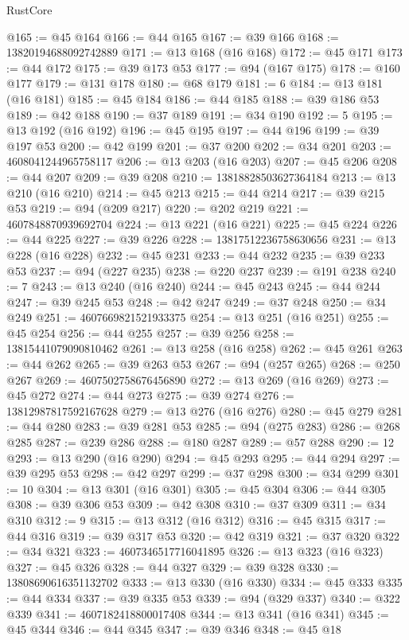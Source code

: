 \begin{lexlean}{RustCore}
\begin{coremodule}
@165 := @45 @164
@166 := @44 @165
@167 := @39 @166
@168 := 13820194688092742889
@171 := @13 @168 (@16 @168)
@172 := @45 @171
@173 := @44 @172
@175 := @39 @173 @53
@177 := @94 (@167 @175)
@178 := @160 @177
@179 := @131 @178
@180 := @68 @179
@181 := 6
@184 := @13 @181 (@16 @181)
@185 := @45 @184
@186 := @44 @185
@188 := @39 @186 @53
@189 := @42 @188
@190 := @37 @189
@191 := @34 @190
@192 := 5
@195 := @13 @192 (@16 @192)
@196 := @45 @195
@197 := @44 @196
@199 := @39 @197 @53
@200 := @42 @199
@201 := @37 @200
@202 := @34 @201
@203 := 4608041244965758117
@206 := @13 @203 (@16 @203)
@207 := @45 @206
@208 := @44 @207
@209 := @39 @208
@210 := 13818828503627364184
@213 := @13 @210 (@16 @210)
@214 := @45 @213
@215 := @44 @214
@217 := @39 @215 @53
@219 := @94 (@209 @217)
@220 := @202 @219
@221 := 4607848870939692704
@224 := @13 @221 (@16 @221)
@225 := @45 @224
@226 := @44 @225
@227 := @39 @226
@228 := 13817512236758630656
@231 := @13 @228 (@16 @228)
@232 := @45 @231
@233 := @44 @232
@235 := @39 @233 @53
@237 := @94 (@227 @235)
@238 := @220 @237
@239 := @191 @238
@240 := 7
@243 := @13 @240 (@16 @240)
@244 := @45 @243
@245 := @44 @244
@247 := @39 @245 @53
@248 := @42 @247
@249 := @37 @248
@250 := @34 @249
@251 := 4607669821521933375
@254 := @13 @251 (@16 @251)
@255 := @45 @254
@256 := @44 @255
@257 := @39 @256
@258 := 13815441079090810462
@261 := @13 @258 (@16 @258)
@262 := @45 @261
@263 := @44 @262
@265 := @39 @263 @53
@267 := @94 (@257 @265)
@268 := @250 @267
@269 := 4607502758676456890
@272 := @13 @269 (@16 @269)
@273 := @45 @272
@274 := @44 @273
@275 := @39 @274
@276 := 13812987817592167628
@279 := @13 @276 (@16 @276)
@280 := @45 @279
@281 := @44 @280
@283 := @39 @281 @53
@285 := @94 (@275 @283)
@286 := @268 @285
@287 := @239 @286
@288 := @180 @287
@289 := @57 @288
@290 := 12
@293 := @13 @290 (@16 @290)
@294 := @45 @293
@295 := @44 @294
@297 := @39 @295 @53
@298 := @42 @297
@299 := @37 @298
@300 := @34 @299
@301 := 10
@304 := @13 @301 (@16 @301)
@305 := @45 @304
@306 := @44 @305
@308 := @39 @306 @53
@309 := @42 @308
@310 := @37 @309
@311 := @34 @310
@312 := 9
@315 := @13 @312 (@16 @312)
@316 := @45 @315
@317 := @44 @316
@319 := @39 @317 @53
@320 := @42 @319
@321 := @37 @320
@322 := @34 @321
@323 := 4607346517716041895
@326 := @13 @323 (@16 @323)
@327 := @45 @326
@328 := @44 @327
@329 := @39 @328
@330 := 13808690616351132702
@333 := @13 @330 (@16 @330)
@334 := @45 @333
@335 := @44 @334
@337 := @39 @335 @53
@339 := @94 (@329 @337)
@340 := @322 @339
@341 := 4607182418800017408
@344 := @13 @341 (@16 @341)
@345 := @45 @344
@346 := @44 @345
@347 := @39 @346
@348 := @45 @18

\end{coremodule}
\end{lexlean}
